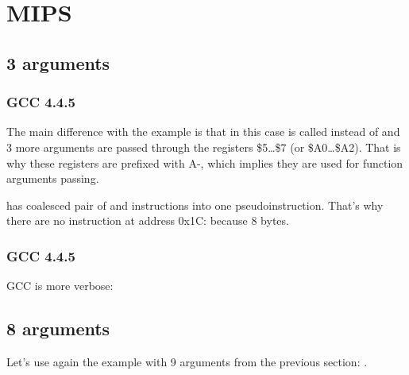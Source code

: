 \section{MIPS}

\subsection{3 arguments}

\subsubsection{\Optimizing GCC 4.4.5}

The main difference with the \q{\HelloWorldSectionName} example is that in this case \printf is called
instead of \puts and 3 more arguments are passed through the registers \$5\dots \$7 (or \$A0\dots \$A2).
That is why these registers are prefixed with A-, which implies they are used for function arguments passing.





\IDA has coalesced pair of  and  instructions into one  pseudoinstruction.
That's why there are no instruction at address 0x1C: because   8 bytes.

\subsubsection{\NonOptimizing GCC 4.4.5}

\NonOptimizing GCC is more verbose:





\subsection{8 arguments}

Let's use again the example with 9 arguments from the previous section: .



